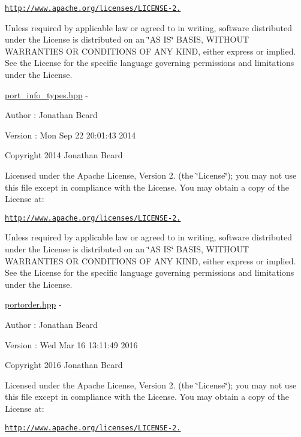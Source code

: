 \href{http://www.apache.org/licenses/LICENSE-2.0}{\tt http\+://www.\+apache.\+org/licenses/\+L\+I\+C\+E\+N\+S\+E-\/2.}

Unless required by applicable law or agreed to in writing, software distributed under the License is distributed on an \char`\"{}\+A\+S I\+S\char`\"{} B\+A\+S\+IS, W\+I\+T\+H\+O\+UT W\+A\+R\+R\+A\+N\+T\+I\+ES OR C\+O\+N\+D\+I\+T\+I\+O\+NS OF A\+NY K\+I\+ND, either express or implied. See the License for the specific language governing permissions and limitations under the License.

\hyperlink{port__info__types_8hpp_source}{port\+\_\+info\+\_\+types.\+hpp} -\/ \begin{DoxyAuthor}{Author}
\+: Jonathan Beard 
\end{DoxyAuthor}
\begin{DoxyVersion}{Version}
\+: Mon Sep 22 20\+:01\+:43 2014
\end{DoxyVersion}
Copyright 2014 Jonathan Beard

Licensed under the Apache License, Version 2. (the \char`\"{}\+License\char`\"{}); you may not use this file except in compliance with the License. You may obtain a copy of the License at\+:

\href{http://www.apache.org/licenses/LICENSE-2.0}{\tt http\+://www.\+apache.\+org/licenses/\+L\+I\+C\+E\+N\+S\+E-\/2.}

Unless required by applicable law or agreed to in writing, software distributed under the License is distributed on an \char`\"{}\+A\+S I\+S\char`\"{} B\+A\+S\+IS, W\+I\+T\+H\+O\+UT W\+A\+R\+R\+A\+N\+T\+I\+ES OR C\+O\+N\+D\+I\+T\+I\+O\+NS OF A\+NY K\+I\+ND, either express or implied. See the License for the specific language governing permissions and limitations under the License.

\hyperlink{portorder_8hpp_source}{portorder.\+hpp} -\/ \begin{DoxyAuthor}{Author}
\+: Jonathan Beard 
\end{DoxyAuthor}
\begin{DoxyVersion}{Version}
\+: Wed Mar 16 13\+:11\+:49 2016
\end{DoxyVersion}
Copyright 2016 Jonathan Beard

Licensed under the Apache License, Version 2. (the \char`\"{}\+License\char`\"{}); you may not use this file except in compliance with the License. You may obtain a copy of the License at\+:

\href{http://www.apache.org/licenses/LICENSE-2.0}{\tt http\+://www.\+apache.\+org/licenses/\+L\+I\+C\+E\+N\+S\+E-\/2.}

